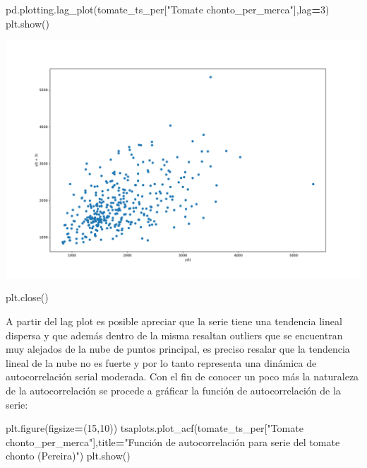 \documentclass[
]{book}
\newenvironment{Shaded}{\begin{snugshade}}{\end{snugshade}}
\newcommand{\DecValTok}[1]{\textcolor[rgb]{0.00,0.00,0.81}{#1}}
\newcommand{\NormalTok}[1]{#1}
\newcommand{\OperatorTok}[1]{\textcolor[rgb]{0.81,0.36,0.00}{\textbf{#1}}}
\newcommand{\StringTok}[1]{\textcolor[rgb]{0.31,0.60,0.02}{#1}}
\begin{document}
\begin{Shaded}
\begin{Highlighting}[]

\NormalTok{pd.plotting.lag\_plot(tomate\_ts\_per[}\StringTok{"Tomate chonto\_per\_merca"}\NormalTok{],lag}\OperatorTok{=}\DecValTok{3}\NormalTok{)}
\NormalTok{plt.show()}
\end{Highlighting}
\end{Shaded}

\includegraphics{bookdown-demo_files/figure-latex/unnamed-chunk-120-107.pdf}

\begin{Shaded}
\begin{Highlighting}[]
\NormalTok{plt.close()}
\end{Highlighting}
\end{Shaded}

A partir del lag plot es posible apreciar que la serie tiene una tendencia lineal dispersa y que además dentro de la misma resaltan outliers que se encuentran muy alejados de la nube de puntos principal, es preciso resalar que la tendencia lineal de la nube no es fuerte y por lo tanto representa una dinámica de autocorrelación serial moderada. Con el fin de conocer un poco más la naturaleza de la autocorrelación se procede a gráficar la función de autocorrelación de la serie:

\begin{Shaded}
\begin{Highlighting}[]

\NormalTok{plt.figure(figsize}\OperatorTok{=}\NormalTok{(}\DecValTok{15}\NormalTok{,}\DecValTok{10}\NormalTok{))}
\NormalTok{tsaplots.plot\_acf(tomate\_ts\_per[}\StringTok{"Tomate chonto\_per\_merca"}\NormalTok{],title}\OperatorTok{=}\StringTok{"Función de autocorrelación para serie del tomate chonto (Pereira)"}\NormalTok{)}
\NormalTok{plt.show()}
\end{Highlighting}
\end{Shaded}
\end{document}
